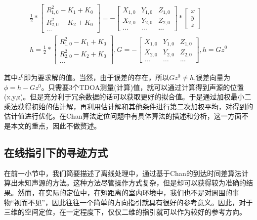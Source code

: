\documentclass[winfonts]{njuthesis}
\begin{document}
		\begin{equation}
		\begin{aligned}
			& \frac{1}{2} * {
				\left[ 
					\begin{array}{c}
						R_{1,0}^2 - K_1 + K_0 \\
						R_{2,0}^2 - K_2 + K_0 \\
						...
					\end{array} 
				\right ]}
				= -{
				\left[ 
					\begin{array}{ccc}
						X_{1,0} & Y_{1,0} & Z_{1,0} \\
						X_{2,0} & Y_{2,0} & Z_{2,0} \\
						  ...   &  ...    &   ...
					\end{array}
				\right ]}*{
				\left[ 
					\begin{array}{c}
						x\\
						y\\
						z
					\end{array}
				\right ]} & \\
			& h = \frac{1}{2} * {
				\left[ 
				\begin{array}{c}
				R_{1,0}^2 - K_1 + K_0 \\
				R_{2,0}^2 - K_2 + K_0 \\
				...
				\end{array} 
				\right ]}, 
			G = -{
				\left[ 
				\begin{array}{ccc}
				X_{1,0} & Y_{1,0} & Z_{1,0} \\
				X_{2,0} & Y_{2,0} & Z_{2,0} \\
				...   &  ...    &   ...
				\end{array}
				\right ]},
			h = Gz^0
		\end{aligned}
		\end{equation}

		其中$z^0$即为要求解的值。当然，由于误差的存在，所以$Gz^0\neq h$,误差向量为$\phi = h - Gz^0$。只需要3个TDOA测量(计算)值，就可以通过计算得到声源的位置(x,y,z)。但是充分利于冗余数据的话可以获取更好的拟合值。于是通过加权最小二乘法获得初始的估计解，再利用估计解和其他条件进行第二次加权平均，对得到的估计值进行优化。在Chan算法定位问题\cite{Chan3DTDOA}中有具体算法的描述和分析，这一方面不是本文的重点，因此不做赘述。
		
		\subsection{在线指引下的寻迹方式}
		
		在前一小节中，我们简要描述了离线处理中，通过基于Chan的到达时间差算法计算出未知声源的方法。这种方法尽管操作方式复杂，但是却可以获得较为准确的结果。然而，在实际的定位中，在短距离的室内环境中，我们也不是对周围的事物“视而不见”，因此往往一个简单的方向指引就具有很好的参考意义。因此，对于三维的空间定位，在一定程度下，仅仅二维的指引就可以作为较好的参考方向。
		
\end{document}
